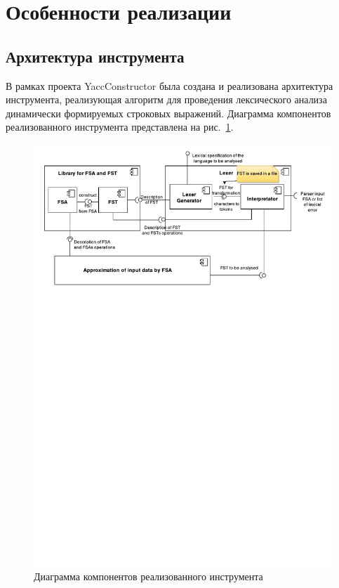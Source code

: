 \documentclass{matmex-diploma}
\begin{document}
\section{Особенности реализации}

\subsection{Архитектура инструмента}

В рамках проекта YaccConstructor была создана и реализована архитектура инструмента, реализующая алгоритм для проведения лексического анализа динамически формируемых строковых выражений. Диаграмма компонентов реализованного инструмента представлена на рис.~\ref{fig:CompDiag}.

\begin{figure}[h!]
\begin{center}
\includegraphics[width=1.0\textwidth]{ComponentDiagram}
\caption{Диаграмма компонентов реализованного инструмента}
\label{fig:CompDiag} 
\end{center}
\end{figure}
\end{document}
